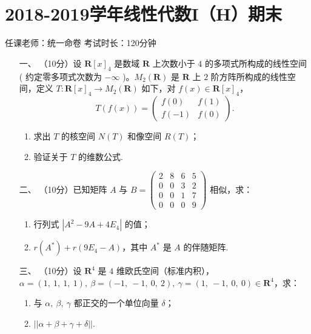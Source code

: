 \section*{2018-2019学年线性代数I（H）期末}

\begin{center}
    任课老师：统一命卷\hspace{4em} 考试时长：120分钟
\end{center}

\begin{enumerate}
	\item[一、]（10分）设 $\mathbf{R}[x]_4$ 是数域 $\mathbf{R}$ 上次数小于 $4$ 的多项式所构成的线性空间 ( 约定零多项式次数为 $-\infty$ )。$M_2(\mathbf{R})$ 是 $\mathbf{R}$ 上 $2$ 阶方阵所构成的线性空间，定义 $T : \mathbf{R}[x]_4 \to M_2(\mathbf{R})$ 如下，对 $f(x) \in \mathbf{R}[x]_4$，
    \[T(f(x))=\begin{pmatrix}f(0) & f(1) \\ f(-1) & f(0)\end{pmatrix}.\]
    \begin{enumerate}[label=(\arabic*)]
        \item 求出 $T$ 的核空间 $N(T)$ 和像空间 $R(T)$；
        \item 验证关于 $T$ 的维数公式.
    \end{enumerate}
	\item[二、]（10分）已知矩阵 $A$ 与 $B=\begin{pmatrix}2 & 8 & 6 & 5 \\ 0 & 0 & 3 & 2 \\ 0 & 0 & 1 & 7 \\ 0 & 0 & 0 & 9\end{pmatrix}$ 相似，求：
    \begin{enumerate}[label=(\arabic*)]
        \item 行列式 $|A^2-9A+4E_4|$ 的值；
        \item $r(A^*)+r(9E_4-A)$，其中 $A^*$ 是 $A$ 的伴随矩阵.
    \end{enumerate}
	\item[三、]（10分）设 $\mathbf{R}^4$ 是 $4$ 维欧氏空间（标准内积），$\alpha=(1,\ 1,\ 1,\ 1),\ \beta=(-1,\ -1,\ 0,\ 2),\ \gamma=(1,\ -1,\ 0,\ 0) \in \mathbf{R}^4$，求：
    \begin{enumerate}[label=(\arabic*)]
        \item 与 $\alpha,\ \beta,\ \gamma$ 都正交的一个单位向量 $\delta$；
        \item $||\alpha+\beta+\gamma+\delta||$.

\end{enumerate}
\end{enumerate}
